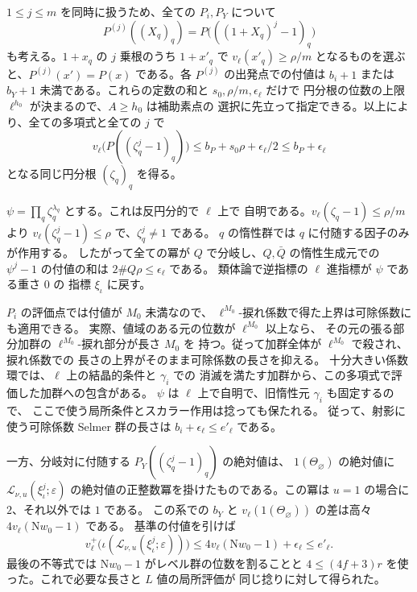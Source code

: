 \(1\le j\le m\) を同時に扱うため、全ての \(P_i,P_Y\) について
\[
 P^{(j)}((X_q)_q)=P\bigl(((1+X_q)^j-1)_q\bigr)
\]
も考える。\(1+x_q\) の \(j\) 乗根のうち \(1+x'_q\) で
\(v_\ell(x'_q)\ge\rho/m\) となるものを選ぶと、\(P^{(j)}(x')=P(x)\)
である。各 \(P^{(j)}\) の出発点での付値は \(b_i+1\) または \(b_Y+1\)
未満である。これらの定数の和と \(s_0,\rho/m,\epsilon_\ell\) だけで
円分根の位数の上限 \(\ell^{h_0}\) が決まるので、\(A\ge h_0\) は補助素点の
選択に先立って指定できる。以上により、全ての多項式と全ての \(j\) で
\[
 v_\ell\bigl(P((\zeta_q^j-1)_q)\bigr)
       \le b_P+s_0\rho+\epsilon_\ell/2\le b_P+\epsilon_\ell
\]
となる同じ円分根 \((\zeta_q)_q\) を得る。

\(\psi=\prod_q\zeta_q^{\lambda_q}\) とする。これは反円分的で \(\ell\) 上で
自明である。\(v_\ell(\zeta_q-1)\le\rho/m\) より
\(v_\ell(\zeta_q^j-1)\le\rho\) で、\(\zeta_q^j\ne1\) である。
\(q\) の惰性群では \(q\) に付随する因子のみが作用する。
したがって全ての冪が \(Q\) で分岐し、\(Q,\bar Q\) の惰性生成元での
\(\psi^j-1\) の付値の和は \(2\#Q\rho\le\epsilon_\ell\) である。
類体論で逆指標の \(\ell\) 進指標が \(\psi\) である重さ \(0\) の
指標 \(\xi_\iota\) に戻す。

\(P_i\) の評価点では付値が \(M_0\) 未満なので、
\(\ell^{M_0}\)-捩れ係数で得た上界は可除係数にも適用できる。
実際、値域のある元の位数が \(\ell^{M_0}\) 以上なら、
その元の張る部分加群の \(\ell^{M_0}\)-捩れ部分が長さ \(M_0\) を
持つ。従って加群全体が \(\ell^{M_0}\) で殺され、捩れ係数での
長さの上界がそのまま可除係数の長さを抑える。
十分大きい係数環では、\(\ell\) 上の結晶的条件と \(\gamma_i\) での
消滅を満たす加群から、この多項式で評価した加群への包含がある。
\(\psi\) は \(\ell\) 上で自明で、旧惰性元 \(\gamma_i\) も固定するので、
ここで使う局所条件とスカラー作用は捻っても保たれる。
従って、射影に使う可除係数 Selmer 群の長さは
\(b_i+\epsilon_\ell\le e'_\ell\) である。

一方、分岐対に付随する \(P_Y((\zeta_q^j-1)_q)\) の絶対値は、
\(1(\Theta_\varnothing)\) の絶対値に \(\mathcal L_{\nu,u}(\xi_\iota^j;\varepsilon)\)
の絶対値の正整数冪を掛けたものである。この冪は \(u=1\) の場合に \(2\)、それ以外では \(1\) である。
この系での \(b_Y\) と
\(v_\ell(1(\Theta_\varnothing))\) の差は高々 \(4v_\ell(\mathrm Nw_0-1)\) である。
基準の付値を引けば
\[
 v_\ell^+\bigl(\iota(\mathcal L_{\nu,u}(\xi_\iota^j;\varepsilon))\bigr)
 \le 4v_\ell(\mathrm Nw_0-1)+\epsilon_\ell
 \le e'_\ell .
\]
最後の不等式では \(\mathrm Nw_0-1\) がレベル群の位数を割ることと
\(4\le(4f+3)r\) を使った。これで必要な長さと \(L\) 値の局所評価が
同じ捻りに対して得られた。

